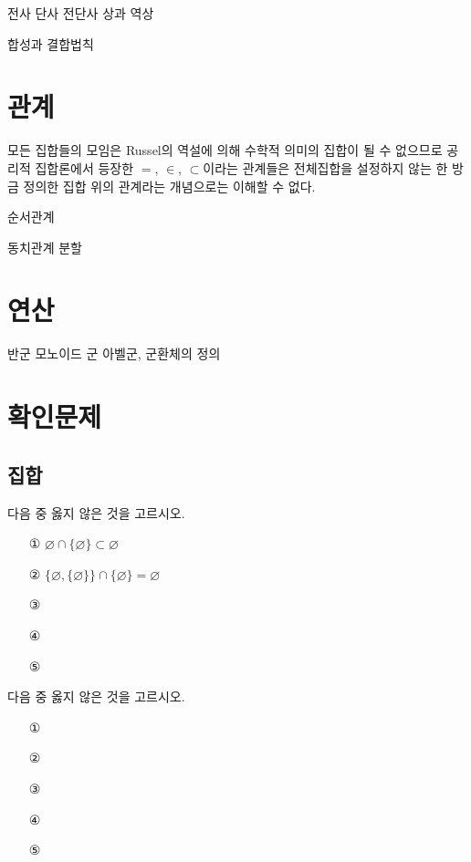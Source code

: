 \documentclass{../../large}
\begin{document}
전사 단사 전단사
상과 역상

합성과 결합법칙



\section{관계}

\begin{definition}[관계]

\end{definition}

모든 집합들의 모임은 Russel의 역설에 의해 수학적 의미의 집합이 될 수 없으므로 공리적 집합론에서 등장한 $=$, $\in$, $\subset$이라는 관계들은 전체집합을 설정하지 않는 한 방금 정의한 집합 위의 관계라는 개념으로는 이해할 수 없다.


순서관계

동치관계
분할



\section{연산}


반군 모노이드 군 아벨군,
군환체의 정의



\twocolumn
\section*{확인문제}

\subsection*{집합}
\begin{problem}
다음 중 옳지 않은 것을 고르시오.
\begin{enumerate}
\item[①] $\varnothing\cap\{\varnothing\}\subset\varnothing$
\item[②] $\{\varnothing,\{\varnothing\}\}\cap\{\varnothing\}=\varnothing$
\item[③]
\item[④]
\item[⑤]
\end{enumerate}
\end{problem}

\begin{problem}
다음 중 옳지 않은 것을 고르시오.
\begin{enumerate}
\item[①]
\item[②]
\item[③]
\item[④]
\item[⑤]
\end{enumerate}
\end{problem}
\end{document}
